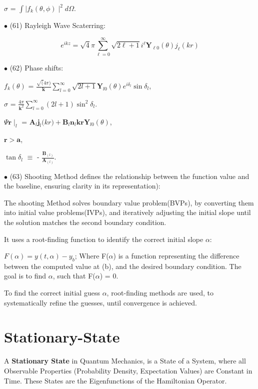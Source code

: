 \documentclass[a4paper, 10pt, onepage]{elegantbook}
\begin{document}
{$\sigma$ = $\int \mid f_k(\theta, \phi) \mid^2 d \Omega$.  

$\bullet$ (61) Rayleigh Wave Scaterring:  

\begin{equation} \label{eq:Rayleigh Wave Scaterring}
e^{ikz} = {\sqrt 4 \pi} \sum_{\ell = 0}^\infty {\sqrt{2 \ell + 1}} i^\ell \mathbf Y_{\ell 0}(\theta) j_\ell(kr)
\end{equation}

$\bullet$ (62) Phase shifts: 

$f_k(\theta)$ = $\frac{\sqrt(4 \pi)} {\mathbf k} \sum_{l = 0}^\infty \sqrt{2l + 1} \mathbf Y_{l 0}( \theta) e^{i 
\delta_l} \sin \delta_l$, 

$\sigma$ = $\frac{4 \pi}{\mathbf k^2} \sum_{l = 0}^\infty(2 l + 1) \sin^2 \delta_{l}$.  

$\Psi \mathbf r \mid_l$ = $\mathbf A_{l} \mathbf j_{l} \mathbf(kr) + \mathbf B_{l} \mathbf n_{l} \mathbf{kr} \mathbf 
Y_{l 0} (\theta)$,  

$\mathbf r > \mathbf a$,  

$\tan \delta_{l}$ $\equiv$  - $\frac{\mathbf B_{(l)}}{\mathbf A_{(l)}}$.  

$\bullet$ (63) Shooting Method defines the relationship between the function value and the baseline, ensuring clarity 
in its representation):  

The shooting Method solves boundary value problem(BVPs), by converting them into initial value 
problems(IVPs), and iteratively adjusting the initial slope until the solution matches the second boundary condition. 

It uses a root-finding function to identify the correct initial slope $\alpha$:  

$F(\alpha) = y(t,\alpha) - y_b$; Where F($\alpha$) is a function representing the difference between the computed value 
at (b), and the desired boundary condition. The goal is to find $\alpha$, such that F($\alpha$) = $0$. 

To find the correct initial guess $\alpha$, root-finding methods are used, to systematically refine the guesses, until 
convergence is achieved.

\chapter{Stationary-State}

A \textbf{Stationary State} in Quantum Mechanics, is a State of a System, where all Observable Properties (Probability 
Density, Expectation Values) are Constant in Time. These States are the Eigenfunctions of the Hamiltonian Operator.  

}
\end{document}
